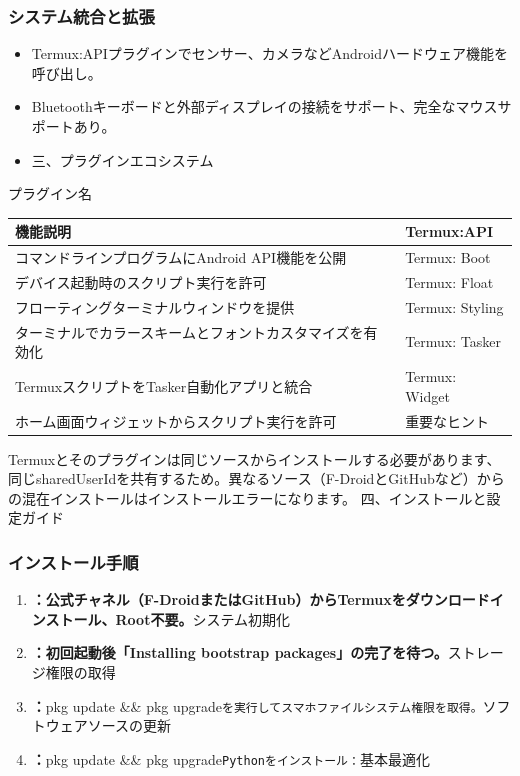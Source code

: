 \subsubsection*{システム統合と拡張}

\begin{itemize}
  \item Termux:APIプラグインでセンサー、カメラなどAndroidハードウェア機能を呼び出し。
  \item Bluetoothキーボードと外部ディスプレイの接続をサポート、完全なマウスサポートあり。
  \item 三、プラグインエコシステム
\end{itemize}


プラグイン名

\begin{center}
\begin{tabularx}{\linewidth}{|X|X|}
\hline
\textbf{機能説明} & \textbf{Termux:API} \tabularnewline
\hline
コマンドラインプログラムにAndroid API機能を公開 & Termux: Boot \tabularnewline
デバイス起動時のスクリプト実行を許可 & Termux: Float \tabularnewline
フローティングターミナルウィンドウを提供 & Termux: Styling \tabularnewline
ターミナルでカラースキームとフォントカスタマイズを有効化 & Termux: Tasker \tabularnewline
TermuxスクリプトをTasker自動化アプリと統合 & Termux: Widget \tabularnewline
ホーム画面ウィジェットからスクリプト実行を許可 & 重要なヒント \tabularnewline
\hline
\end{tabularx}
\end{center}

\begin{tcbwarn}{Termuxとそのプラグインは同じソースからインストールする必要があります、同じsharedUserIdを共有するため。異なるソース（F-DroidとGitHubなど）からの混在インストールはインストールエラーになります。}
四、インストールと設定ガイド

\end{tcbwarn}


\subsubsection*{インストール手順}

\begin{enumerate}
  \item \textbf{：公式チャネル（F-DroidまたはGitHub）からTermuxをダウンロードインストール、Root不要。}システム初期化
  \item \textbf{：初回起動後「Installing bootstrap packages」の完了を待つ。}ストレージ権限の取得
  \item \textbf{：}pkg update \&\& pkg upgrade\texttt{を実行してスマホファイルシステム権限を取得。}ソフトウェアソースの更新
  \item \textbf{：}pkg update \&\& pkg upgrade\texttt{Pythonをインストール：}基本最適化
\end{enumerate}

